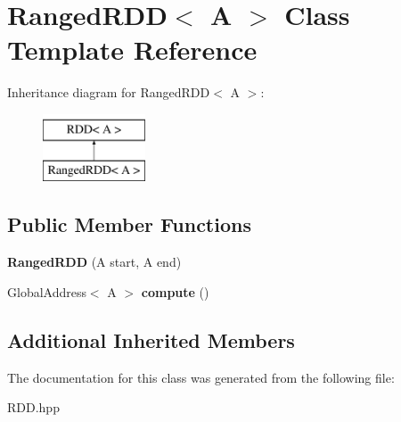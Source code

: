 \hypertarget{class_ranged_r_d_d}{}\section{Ranged\+R\+D\+D$<$ A $>$ Class Template Reference}
\label{class_ranged_r_d_d}
Inheritance diagram for Ranged\+R\+D\+D$<$ A $>$\+:\begin{figure}[H]
\begin{center}
\leavevmode
\includegraphics[height=2.000000cm]{class_ranged_r_d_d}
\end{center}
\end{figure}
\subsection*{Public Member Functions}
\begin{DoxyCompactItemize}
\item 
\hypertarget{class_ranged_r_d_d_ad6639a02411c8f03d2443e250720ec5a}{}{\bfseries Ranged\+R\+D\+D} (A start, A end)\label{class_ranged_r_d_d_ad6639a02411c8f03d2443e250720ec5a}

\item 
\hypertarget{class_ranged_r_d_d_a556bf430ea4bf9762b46fdaf3a23ac42}{}Global\+Address$<$ A $>$ {\bfseries compute} ()\label{class_ranged_r_d_d_a556bf430ea4bf9762b46fdaf3a23ac42}

\end{DoxyCompactItemize}
\subsection*{Additional Inherited Members}


The documentation for this class was generated from the following file\+:\begin{DoxyCompactItemize}
\item 
R\+D\+D.\+hpp\end{DoxyCompactItemize}
